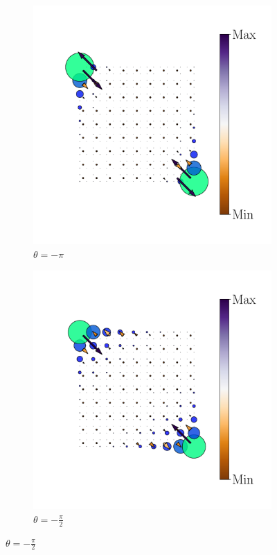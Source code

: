 \begin{figure}[h!]
     \centering
    \captionsetup[sub]{font=small}
     \begin{minipage}[h!]{1.1\textwidth}
         \begin{subfigure}[b!]{0.2 \textwidth}
             \caption{$\theta = -\pi$}
             \includegraphics[width=\textwidth]{Imagenes/Resultados_pump_Cuadrado/x/hoti_pomp_x_pos1.pdf}
         \end{subfigure}\hspace*{-0.5em}
          \begin{subfigure}[b!]{0.2 \textwidth}
             \caption*{$\theta = -\frac{\pi}{2}$}
             \includegraphics[width=\textwidth]{Imagenes/Resultados_pump_Cuadrado/x/hoti_pomp_x_pos2.pdf}

\end{subfigure}
\end{minipage}
\end{figure}

